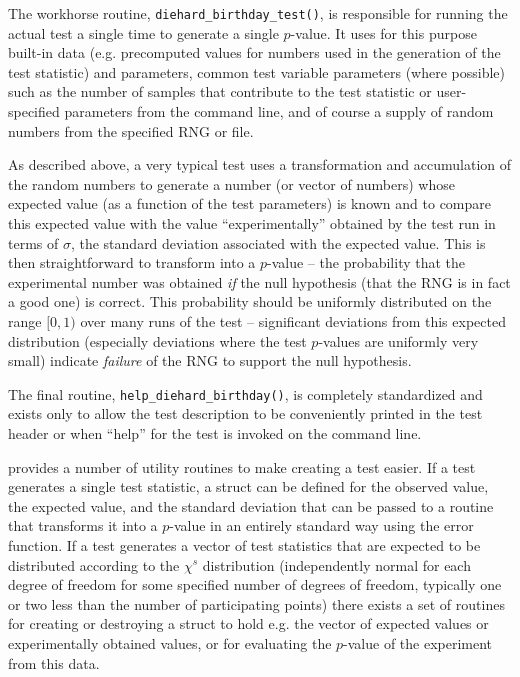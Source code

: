 \documentclass{book}
\begin{document}
The workhorse routine, {\tt diehard\_birthday\_test()}, is responsible for
running the actual test a single time to generate a single $p$-value.
It uses for this purpose built-in data (e.g. precomputed values for
numbers used in the generation of the test statistic) and parameters,
common test variable parameters (where possible) such as the number of
samples that contribute to the test statistic or user-specified
parameters from the command line, and of course a supply of random
numbers from the specified RNG or file.  

As described above, a very typical test uses a transformation and
accumulation of the random numbers to generate a number (or vector of
numbers) whose expected value (as a function of the test parameters) is
known and to compare this expected value with the value
``experimentally'' obtained by the test run in terms of $\sigma$, the
standard deviation associated with the expected value.  This is then
straightforward to transform into a $p$-value -- the probability that
the experimental number was obtained {\em if} the null hypothesis (that
the RNG is in fact a good one) is correct.  This probability should be
uniformly distributed on the range $[0,1)$ over many runs of the test --
significant deviations from this expected distribution (especially
deviations where the test $p$-values are uniformly very small) indicate
{\em failure} of the RNG to support the null hypothesis.

The final routine, {\tt help\_diehard\_birthday()}, is completely
standardized and exists only to allow the test description to be
conveniently printed in the test header or when ``help'' for the test is
invoked on the command line.

\die provides a number of utility routines to make creating a test
easier.  If a test generates a single test statistic, a struct can be
defined for the observed value, the expected value, and the standard
deviation that can be passed to a routine that transforms it into a
$p$-value in an entirely standard way using the error function.  If a
test generates a vector of test statistics that are expected to be
distributed according to the $\chi^s$ distribution (independently normal
for each degree of freedom for some specified number of degrees of
freedom, typically one or two less than the number of participating
points) there exists a set of routines for creating or destroying a
struct to hold e.g. the vector of expected values or experimentally
obtained values, or for evaluating the $p$-value of the experiment from
this data.
\end{document}
